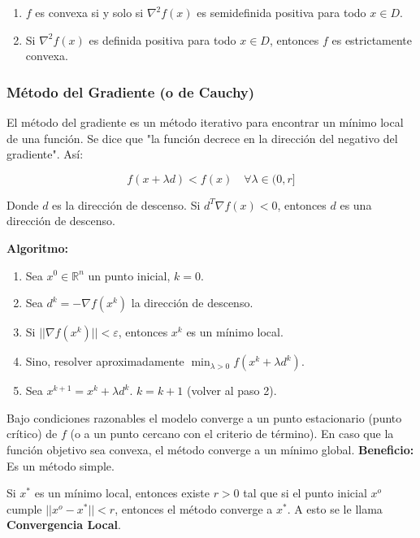 \documentclass{article}
\begin{document}
\begin{enumerate}
    \item $f$ es convexa si y solo si $\nabla^2 f(x)$ es semidefinida positiva para todo $x \in D$.
    \item Si $\nabla^2 f(x)$ es definida positiva para todo $x \in D$, entonces $f$ es estrictamente convexa.
\end{enumerate}

\subsubsection{Método del Gradiente (o de Cauchy)}

El método del gradiente es un método iterativo para encontrar un mínimo local de una función. Se dice que "la función decrece en la dirección del negativo del gradiente". Así:

\begin{equation*}
    f(x+\lambda d) < f(x) \quad \forall \lambda \in (0, r]
\end{equation*}

Donde $d$ es la dirección de descenso. Si $d^T \nabla f(x) < 0$, entonces $d$ es una dirección de descenso.

\textbf{Algoritmo:}

\begin{enumerate}
    \item Sea $x^0 \in \mathbb{R}^n$ un punto inicial, $k=0$.
    \item Sea $d^k = -\nabla f(x^k)$ la dirección de descenso.
    \item Si $||\nabla f(x^k)|| < \varepsilon$, entonces $x^k$ es un mínimo local.
    \item Sino, resolver aproximadamente $\min_{\lambda>0} f(x^k + \lambda d^k)$.
    \item Sea $x^{k+1}=x^k + \lambda d^k$. $k = k+1$ (volver al paso 2).
\end{enumerate}

Bajo condiciones razonables el modelo converge a un punto estacionario (punto crítico) de $f$ (o a un punto cercano con el criterio de término). En caso que la función objetivo sea convexa, el método converge a un mínimo global. \textbf{Beneficio:} Es un método simple.

Si $x^*$ es un mínimo local, entonces existe $r>0$ tal que si el punto inicial $x^o$ cumple $||x^o - x^*|| < r$, entonces el método converge a $x^*$. A esto se le llama \textbf{Convergencia Local}.
\end{document}
